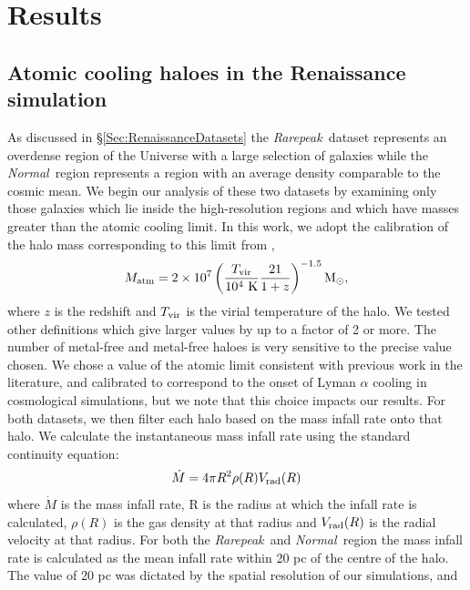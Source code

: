 \documentclass[graphics, twocolumn, usenatbib]{mn2e}
\newcommand{\rarepeak} {\textit{Rarepeak~}}
\newcommand{\normal} {\textit{Normal~}}
\begin{document}
\section{Results} \label{Sec:Results}

\subsection{Atomic cooling haloes in the Renaissance simulation}

As discussed in \S \ref{Sec:RenaissanceDatasets} the \rarepeak dataset represents an overdense
region of the Universe with a large selection of galaxies while the \normal region represents a
region with an average density comparable to the cosmic mean. We begin our analysis of these two
datasets by examining only those galaxies which lie inside the high-resolution regions and which
have masses greater than the atomic cooling limit. In this work, we
adopt the calibration of  
 the halo mass corresponding to this 
limit from \cite{Fernandez_2014},
%
\begin{equation}
  M_{\rm atm} = 2 \times 10^{7} \left( \frac{{T_{\rm vir}}}{10^4~{\rm K}}  \frac{21}{1+z} \right)^{-1.5} \rm{M_{\odot}},
\end{equation}
%
where $z$ is the redshift and $T_{\rm vir}$ is the virial temperature of the halo. 
We tested other definitions \citep[e.g.][]{Bromm_2011} which give larger
values by up to a factor of 2 or more. The number of metal-free and metal-free haloes
is very sensitive to the precise value chosen. We chose a value of the atomic limit consistent
with previous work in the literature, and
calibrated to correspond to the onset of Lyman $\alpha$ cooling in cosmological simulations, %
but we note that this choice impacts our results.
For both datasets, we then filter each halo based on the mass infall rate onto that halo.
We calculate the instantaneous mass infall rate using the standard continuity equation:
\begin{equation}  
  \dot{M} = 4 \pi R^2 \rho(R) V_{\rm rad}(R)
\end{equation}
where  $\dot{M}$ is the mass infall rate, R is the radius at which the infall rate is calculated,
$\rho(R)$ is the gas density at that radius and $V_{\rm rad}(R)$ is the radial velocity at that radius.
For both the \rarepeak and \normal region the mass infall rate is calculated as the mean
infall rate within 20 pc of the centre of the halo. 
The value of 20 pc was dictated by the spatial resolution of our simulations, and
\end{document}
